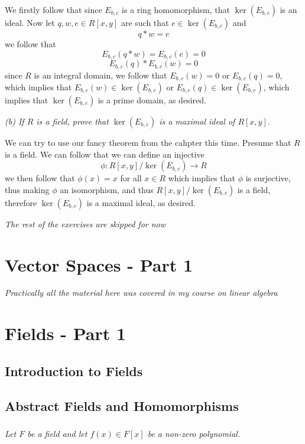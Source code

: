 \documentclass[11pt,oneside,titlepage]{book}
\begin{document}
We firstly follow that since $E_{b, c}$ is a ring homomorphism, that
$\ker(E_{b, c})$ is an ideal. Now let $q, w, e \in R[x, y]$
are such that $e \in \ker(E_{b, c})$ and
$$q * w = e$$
we follow that
$$E_{b, c}(q * w) = E_{b, c}(e) = 0$$
$$E_{b, c}(q) * E_{b, c}(w) = 0$$
since $R$ is an integral domain, we follow that $E_{b, c}(w) = 0$
or $E_{b, c}(q) = 0$, which implies that $E_{b, c}(w) \in \ker(E_{b, c})$
or $E_{b, c}(q) \in \ker(E_{b, c})$, which implies that $\ker(E_{b, c})$
is a prime domain, as desired.

\textit{(b) If $R$ is a field, prove that $\ker(E_{b,c})$ is a
  maximal ideal of $R[x, y]$.}

We can try to use our fancy theorem from the cahpter this time.
Presume that $R$ is a field. We can follow that we can define an
injective
$$\phi: R[x, y]/\ker(E_{b,c}) \to R$$
we then follow that $\phi(x) = x$ for all $x \in R$ which implies that
$\phi$ is surjective, thus making $\phi$ an isomorphism, and thus
$R[x, y]/\ker(E_{b,c})$ is a field, therefore $\ker(E_{b,c})$ is a
maximal ideal, as desired.


\textit{The rest of the exercises are skipped for now}

\chapter{Vector Spaces - Part 1}

\textit{Practically all the material here was covered in my course on
  linear algebra }

\chapter{Fields - Part 1} 

\section{Introduction to Fields}

\section{Abstract Fields and Homomorphisms}

\subsection{}

\textit{Let $F$ be a field and let $f(x) \in F[x]$ be a non-zero polynomial.}
\end{document}
